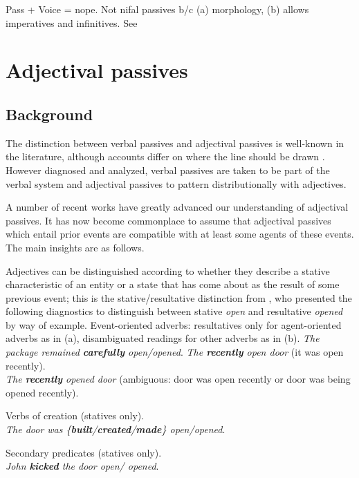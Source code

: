 Pass + Voice = nope.
	Not nifal passives b/c (a) morphology, (b) allows imperatives and infinitives.
	See \cite{ahdoutkastner18}
	

\section{Adjectival passives} \label{passn:adjpass}

	\subsection{Background}

The distinction between verbal passives and adjectival passives is well-known in the literature, although accounts differ on where the line should be drawn \citep{wasow77,levinrappaport86,borerwexler87,embick04li,bruening14nllt}. However diagnosed and analyzed, verbal passives are taken to be part of the verbal system and adjectival passives to pattern distributionally with adjectives. 


A number of recent works have greatly advanced our understanding of adjectival passives. It has now become commonplace to assume that adjectival passives which entail prior events are compatible with at least some agents of these events. The main insights are as follows.

Adjectives can be distinguished according to whether they describe a stative characteristic of an entity or a state that has come about as the result of some previous event; this is the stative/resultative distinction from \cite{embick04li}, who presented the following diagnostics to distinguish between stative \emph{open} and resultative \emph{opened} by way of example.
\pex Event-oriented adverbs: resultatives only for agent-oriented adverbs as in (a), disambiguated readings for other adverbs as in (b).
	\a \emph{The package remained \textbf{carefully} \xmark open/\cmark opened}.
	\a \emph{The \textbf{recently} open door} (it was open recently).\\
		\emph{The \textbf{recently} opened door} (ambiguous: door was open recently or door was being opened recently).
\xe

\ex Verbs of creation (statives only).\\
	\emph{The door was \{\textbf{built}/\textbf{created}/\textbf{made}\} \cmark open/\xmark opened}.
\xe

\ex Secondary predicates (statives only).\\
	\emph{John \textbf{kicked} the door \cmark open/ \xmark opened}.
\xe

